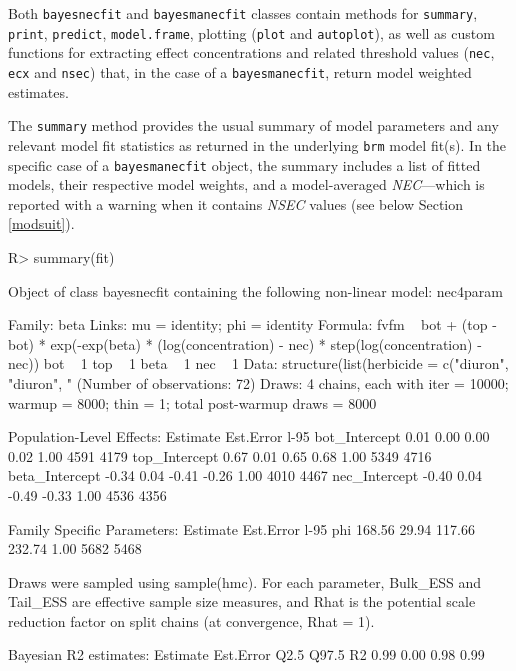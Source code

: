 \documentclass[
  shortnames]{jss}
\begin{document}
Both \texttt{bayesnecfit} and \texttt{bayesmanecfit} classes contain methods for \texttt{summary}, \texttt{print}, \texttt{predict}, \texttt{model.frame}, plotting (\texttt{plot} and \texttt{autoplot}), as well as custom functions for extracting effect concentrations and related threshold values (\texttt{nec}, \texttt{ecx} and \texttt{nsec}) that, in the case of a \texttt{bayesmanecfit}, return model weighted estimates.

The \texttt{summary} method provides the usual summary of model parameters and any relevant model fit statistics as returned in the underlying \texttt{brm} model fit(s). In the specific case of a \texttt{bayesmanecfit} object, the summary includes a list of fitted models, their respective model weights, and a model-averaged \emph{NEC}---which is reported with a warning when it contains \emph{NSEC} values (see below Section \ref{modsuit}).

\begin{CodeChunk}
\begin{CodeInput}
R> summary(fit)
\end{CodeInput}
\begin{CodeOutput}
Object of class bayesnecfit containing the following non-linear model: nec4param

 Family: beta 
  Links: mu = identity; phi = identity 
Formula: fvfm ~ bot + (top - bot) * exp(-exp(beta) * (log(concentration) - nec) * step(log(concentration) - nec)) 
         bot ~ 1
         top ~ 1
         beta ~ 1
         nec ~ 1
   Data: structure(list(herbicide = c("diuron", "diuron", " (Number of observations: 72) 
  Draws: 4 chains, each with iter = 10000; warmup = 8000; thin = 1;
         total post-warmup draws = 8000

Population-Level Effects: 
               Estimate Est.Error l-95%
bot_Intercept      0.01      0.00     0.00     0.02 1.00     4591     4179
top_Intercept      0.67      0.01     0.65     0.68 1.00     5349     4716
beta_Intercept    -0.34      0.04    -0.41    -0.26 1.00     4010     4467
nec_Intercept     -0.40      0.04    -0.49    -0.33 1.00     4536     4356

Family Specific Parameters: 
    Estimate Est.Error l-95%
phi   168.56     29.94   117.66   232.74 1.00     5682     5468

Draws were sampled using sample(hmc). For each parameter, Bulk_ESS
and Tail_ESS are effective sample size measures, and Rhat is the potential
scale reduction factor on split chains (at convergence, Rhat = 1).


Bayesian R2 estimates:
   Estimate Est.Error Q2.5 Q97.5
R2     0.99      0.00 0.98  0.99
\end{CodeOutput}
\end{CodeChunk}
\end{document}

